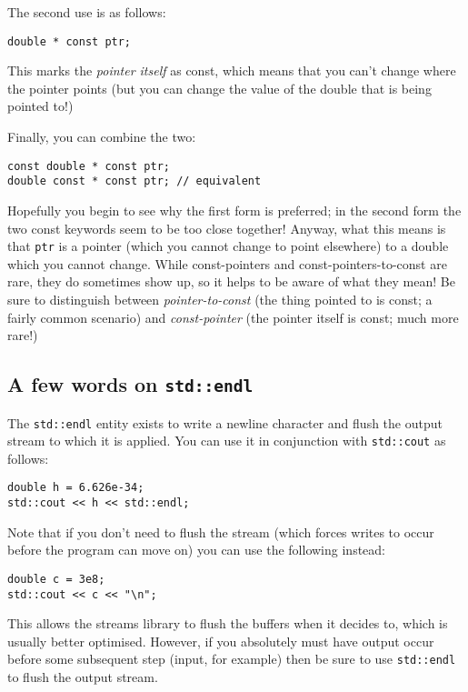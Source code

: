 \documentclass[a4paper]{scrartcl}
\begin{document}
The second use is as follows:

\begin{verbatim}
double * const ptr;
\end{verbatim}

This marks the \emph{pointer itself} as const, which means that you can't change where the pointer points (but you can change the value of the double that is being pointed to!)

Finally, you can combine the two:
\begin{verbatim}
const double * const ptr;
double const * const ptr; // equivalent
\end{verbatim}

Hopefully you begin to see why the first form is preferred; in the second form the two const keywords seem to be too close together! Anyway, what this means is that \verb|ptr| is a pointer (which you cannot change to point elsewhere) to a double which you cannot change. While const-pointers and const-pointers-to-const are rare, they do sometimes show up, so it helps to be aware of what they mean! Be sure to distinguish between \emph{pointer-to-const} (the thing pointed to is const; a fairly common scenario) and \emph{const-pointer} (the pointer itself is const; much more rare!)

\subsection{A few words on \texttt{std::endl}}
The \verb|std::endl| entity exists to write a newline character and flush the output stream to which it is applied. You can use it in conjunction with \verb|std::cout| as follows:

\begin{verbatim}
double h = 6.626e-34;
std::cout << h << std::endl;
\end{verbatim}

Note that if you don't need to flush the stream (which forces writes to occur before the program can move on) you can use the following instead:

\begin{verbatim}
double c = 3e8;
std::cout << c << "\n";
\end{verbatim}

This allows the streams library to flush the buffers when it decides to, which is usually better optimised. However, if you absolutely must have output occur before some subsequent step (input, for example) then be sure to use \verb|std::endl| to flush the output stream.
\end{document}
